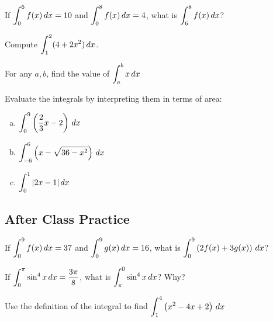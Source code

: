 \documentclass[notes]{subfiles}
\begin{document}
		\begin{ex}
			If \(\displaystyle \int_0^6 f(x)\, dx = 10\) and \(\displaystyle \int_0^8 f(x)\, dx = 4\), what is \(\displaystyle\int_6^8 f(x)\, dx\)?
		\end{ex}	
			\newpage
	
		\begin{ex}
			Compute \(\displaystyle \int_1^2 (4+2x^2)\,dx\).
		\end{ex}

		\begin{ex}
			For any \(a,b\), find the value of \(\displaystyle \int_a^b x\, dx\) 			
		\end{ex}
			\newpage
			
		\begin{ex}
			Evaluate the integrals by interpreting them in terms of area:
			\begin{enumerate}[(a)]
				\item \(\displaystyle \int_0^9 \left( \dfrac{2}{3}x - 2\right)\, dx\)
					
				\item \(\displaystyle \int_{-6}^6 \left( x - \sqrt{36-x^2}\right)\, dx\)
					
				\item \(\displaystyle \int_0^1 |2x - 1|\, dx\)
			\end{enumerate}
		\end{ex}
			\newpage 
		
	\subsection*{After Class Practice}
		\begin{ex}
			If \(\displaystyle \int_0^9 f(x)\, dx = 37\) and \(\displaystyle \int_0^9 g(x)\, dx = 16\), what is \(\displaystyle \int_0^9 \left( 2f(x) + 3g(x)\right)\, dx\)?
		\end{ex}
			\vs{1}
		\begin{ex}
			If \(\displaystyle \int_0^\pi \sin^4 x\, dx = \dfrac{3\pi}{8}\), what is \(\displaystyle \int_\pi^0 \sin^4 x\, dx\)?  Why?
		\end{ex}
			\vs{1}
			\newpage
				
		\begin{ex}
			Use the definition of the integral to find \(\displaystyle \int_1^4 \left( x^2 - 4x + 2\right)\, dx \)
		\end{ex}
			
		
\clearpage
\end{document}
